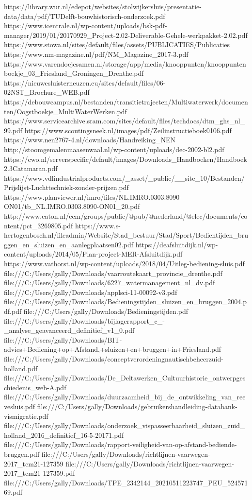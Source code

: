 https://library.wur.nl/edepot/websites/stolwijkersluis/presentatie-data/data/pdf/TUDelft-bouwhistorisch-onderzoek.pdf
https://www.icentrale.nl/wp-content/uploads/bsk-pdf-manager/2019/01/20170929_Project-2.02-Deliverable-Gehele-werkpakket-2.02.pdf
https://www.stowa.nl/sites/default/files/assets/PUBLICATIES/Publicaties%
https://www.nm-magazine.nl/pdf/NM_Magazine_2017-3.pdf
https://www.varendoejesamen.nl/storage/app/media/knooppunten/knooppuntenboekje_03_Friesland_Groningen_Drenthe.pdf
https://nieuwesluisterneuzen.eu/sites/default/files/06-02NST_Brochure_WEB.pdf
https://debouwcampus.nl/bestanden/transitietrajecten/Multiwaterwerk/documenten/Oogstboekje_MultiWaterWerken.pdf
https://www.servicearchive.sram.com/sites/default/files/techdocs/dtm_ghs_nl_99.pdf
https://www.scoutingsneek.nl/images/pdf/Zeilinstructieboek0106.pdf
https://www.nen2767-4.nl/downloads/Handreiking_NEN%
http://stoomgemalenmaasenwaal.nl/wp-content/uploads/dec-2002-bl2.pdf
https://cwo.nl/serverspecific/default/images/Downloads_Handboeken/Handboek2.3Catamaran.pdf
https://www.vdlindustrialproducts.com/_asset/_public/__site_10/Bestanden/Prijslijst-Luchttechniek-zonder-prijzen.pdf
https://www.planviewer.nl/imro/files/NL.IMRO.0303.8090-ON01/tb_NL.IMRO.0303.8090-ON01_20.pdf
http://www.eaton.nl/ecm/groups/public/@pub/@nederland/@elec/documents/content/pct_3269805.pdf
https://www.s-hertogenbosch.nl/fileadmin/Website/Stad_bestuur/Stad/Sport/Bedientijden_bruggen_en_sluizen_en_aanlegplaatsen02.pdf
https://deafsluitdijk.nl/wp-content/uploads/2014/05/Plan-project-MER-Afsluitdijk.pdf
https://www.vathorst.nl/wp-content/uploads/2018/04/Uitleg-bediening-sluis.pdf
file:///C:/Users/gally/Downloads/vaarroutekaart_provincie_drenthe.pdf
file:///C:/Users/gally/Downloads/6227_watermanagement_nl_dv.pdf
file:///C:/Users/gally/Downloads/applsci-11-00092-v3.pdf
file:///C:/Users/gally/Downloads/Bedieningstijden_sluizen_en_bruggen_2004.pdf.pdf
file:///C:/Users/gally/Downloads/Bedieningstijden.pdf
file:///C:/Users/gally/Downloads/bijlagerapport_c_-_analyse_geavanceerd_definitief_v1_0.pdf
file:///C:/Users/gally/Downloads/BIT-advies+Bediening+op+Afstand,+sluizen+en+bruggen+in+Friesland.pdf
file:///C:/Users/gally/Downloads/conceptverordeningnautischbeheerzuid-holland.pdf
file:///C:/Users/gally/Downloads/De_Deltawerken_Cultuurhistorie_ontwerpgeschiedenis_web-A.pdf
file:///C:/Users/gally/Downloads/duurzaamheid_bij_de_ontwikkeling_van_reevesluis.pdf
file:///C:/Users/gally/Downloads/gebruikershandleiding-databank-vismigratie.pdf
file:///C:/Users/gally/Downloads/onderzoek_vispasseerbaarheid_sluizen_zuid_holland_2016_definitief_16-5-20171.pdf
file:///C:/Users/gally/Downloads/rapport-veiligheid-van-op-afstand-bediende-bruggen.pdf
file:///C:/Users/gally/Downloads/richtlijnen-vaarwegen-2017_tcm21-127359%
file:///C:/Users/gally/Downloads/richtlijnen-vaarwegen-2017_tcm21-127359.pdf
file:///C:/Users/gally/Downloads/TPE_2342144_20210511223747_PEU_52457169.pdf


